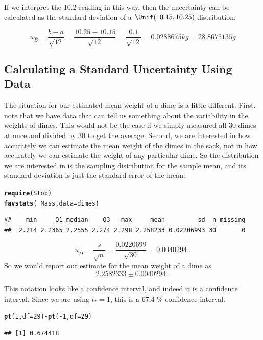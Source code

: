 \documentclass[twoside]{book}\usepackage[]{graphicx}\usepackage[]{xcolor}
\makeatletter
\newcommand{\hlnum}[1]{\textcolor[rgb]{0.686,0.059,0.569}{#1}}%
\newcommand{\hlopt}[1]{\textcolor[rgb]{0,0,0}{#1}}%
\newcommand{\hlstd}[1]{\textcolor[rgb]{0.345,0.345,0.345}{#1}}%
\newcommand{\hlkwc}[1]{\textcolor[rgb]{0.333,0.667,0.333}{#1}}%
\newcommand{\hlkwd}[1]{\textcolor[rgb]{0.737,0.353,0.396}{\textbf{#1}}}%
\newenvironment{kframe}{%
 \def\at@end@of@kframe{}%
 \ifinner\ifhmode%
  \def\at@end@of@kframe{\end{minipage}}%
  \begin{minipage}{\columnwidth}%
 \fi\fi%
 \def\FrameCommand##1{\hskip\@totalleftmargin \hskip-\fboxsep
 \colorbox{shadecolor}{##1}\hskip-\fboxsep
     \hskip-\linewidth \hskip-\@totalleftmargin \hskip\columnwidth}%
 \MakeFramed {\advance\hsize-\width
   \@totalleftmargin\z@ \linewidth\hsize
   \@setminipage}}%
 {\par\unskip\endMakeFramed%
 \at@end@of@kframe}
\newenvironment{knitrout}{}{} %
\makeatother
\begin{document}
If we interpret the 10.2 reading in this way, then the uncertainty can be
calculated as the standard deviation of a $\Unif(10.15, 10.25)$-distribution:  

\[
u_{\hat B} = \frac{b-a}{\sqrt{12}} 
= \frac{10.25-10.15}{\sqrt{12}} 
= \frac{0.1}{\sqrt{12}} 
= 0.0288675 kg
= 28.8675135 g
\]

\subsection{Calculating a Standard Uncertainty Using Data}

The situation for our estimated mean weight of a dime is a little different.  
First, note that 
we have data that can tell us something about the variability in the weights of dimes.  
This would not be the case if we simply measured all 30 dimes at once and
divided by 30 to get the average.  Second, we are interested in how accurately we can
estimate the mean weight of the dimes in the sack, 
not in how accurately we can estimate the weight of any particular dime.  
So the distribution we are interested in is the sampling distribution for the 
sample mean, and its standard deviation is just the standard error of the mean:
\begin{knitrout}
\color{fgcolor}\begin{kframe}
\begin{alltt}
\hlkwd{require}\hlstd{(Stob)}
\hlkwd{favstats}\hlstd{(}\hlopt{~}\hlstd{Mass,} \hlkwc{data} \hlstd{= dimes)}
\end{alltt}
\begin{verbatim}
##    min     Q1 median    Q3   max     mean         sd  n missing
##  2.214 2.2365 2.2555 2.274 2.298 2.258233 0.02206993 30       0
\end{verbatim}
\end{kframe}
\end{knitrout}

\[
u_{\hat D} = \frac{s}{\sqrt{n}} 
= \frac{0.0220699}{\sqrt{30}} 
= 0.0040294\;.
\]
So we would report our estimate for the mean weight of a dime as 
\[
2.2582333 \pm 0.0040294 \;.
\]

This notation looks like a confidence interval, and indeed it is a confidence interval.  
Since we are using $t_* = 1$, this is a 
67.4 \% confidence interval.
\begin{knitrout}
\color{fgcolor}\begin{kframe}
\begin{alltt}
\hlkwd{pt}\hlstd{(}\hlnum{1}\hlstd{,} \hlkwc{df} \hlstd{=} \hlnum{29}\hlstd{)} \hlopt{-} \hlkwd{pt}\hlstd{(}\hlopt{-}\hlnum{1}\hlstd{,} \hlkwc{df} \hlstd{=} \hlnum{29}\hlstd{)}
\end{alltt}
\begin{verbatim}
## [1] 0.674418
\end{verbatim}
\end{kframe}
\end{knitrout}
\end{document}
